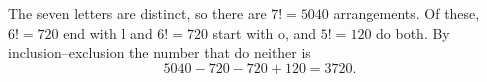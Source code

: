 The seven letters are distinct, so there are $7!=5040$ arrangements. Of these, $6!=720$ end with l and $6!=720$ start with o, and $5!=120$ do both. By inclusion--exclusion the number that do neither is
\[5040-720-720+120=\boxed{3720}.\]
